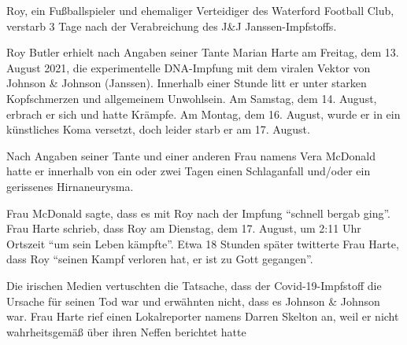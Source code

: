 Roy, ein Fußballspieler und ehemaliger Verteidiger des Waterford Football Club,
verstarb 3 Tage nach der Verabreichung des J\&J Janssen-Impfstoffs.

Roy Butler erhielt nach Angaben seiner Tante Marian Harte am Freitag, dem
13. August 2021, die experimentelle DNA-Impfung mit dem viralen Vektor von
Johnson \& Johnson (Janssen). Innerhalb einer Stunde litt er unter starken
Kopfschmerzen und allgemeinem Unwohlsein. Am Samstag, dem 14. August, erbrach er
sich und hatte Krämpfe. Am Montag, dem 16. August, wurde er in ein künstliches
Koma versetzt, doch leider starb er am 17. August.

Nach Angaben seiner Tante und einer anderen Frau namens Vera McDonald hatte er
innerhalb von ein oder zwei Tagen einen Schlaganfall und/oder ein gerissenes
Hirnaneurysma.

Frau McDonald sagte, dass es mit Roy nach der Impfung ``schnell bergab
ging''. Frau Harte schrieb, dass Roy am Dienstag, dem 17. August, um 2:11 Uhr
Ortszeit ``um sein Leben kämpfte''. Etwa 18 Stunden später twitterte Frau Harte,
dass Roy ``seinen Kampf verloren hat, er ist zu Gott gegangen''.

Die irischen Medien vertuschten die Tatsache, dass der Covid-19-Impfstoff die
Ursache für seinen Tod war und erwähnten nicht, dass es Johnson \& Johnson
war. Frau Harte rief einen Lokalreporter namens Darren Skelton an, weil er nicht
wahrheitsgemäß über ihren Neffen berichtet hatte
